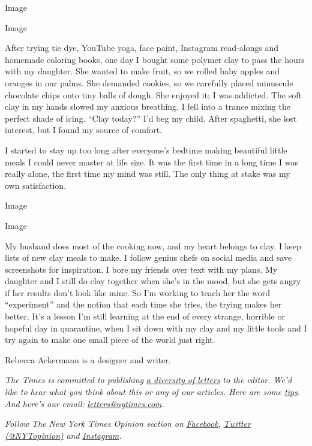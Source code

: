 Image

Image

After trying tie dye, YouTube yoga, face paint, Instagram read-alongs
and homemade coloring books, one day I bought some polymer clay to pass
the hours with my daughter. She wanted to make fruit, so we rolled baby
apples and oranges in our palms. She demanded cookies, so we carefully
placed minuscule chocolate chips onto tiny balls of dough. She enjoyed
it; I was addicted. The soft clay in my hands slowed my anxious
breathing. I fell into a trance mixing the perfect shade of icing.
``Clay today?'' I'd beg my child. After spaghetti, she lost interest,
but I found my source of comfort.

I started to stay up too long after everyone's bedtime making beautiful
little meals I could never master at life size. It was the first time in
a long time I was really alone, the first time my mind was still. The
only thing at stake was my own satisfaction.

Image

Image

My husband does most of the cooking now, and my heart belongs to clay. I
keep lists of new clay meals to make. I follow genius chefs on social
media and save screenshots for inspiration. I bore my friends over text
with my plans. My daughter and I still do clay together when she's in
the mood, but she gets angry if her results don't look like mine. So I'm
working to teach her the word ``experiment'' and the notion that each
time she tries, the trying makes her better. It's a lesson I'm still
learning at the end of every strange, horrible or hopeful day in
quarantine, when I sit down with my clay and my little tools and I try
again to make one small piece of the world just right.

Rebecca Ackermann is a designer and writer.

\emph{The Times is committed to publishing}
\href{https://www.nytimes.com/2019/01/31/opinion/letters/letters-to-editor-new-york-times-women.html}{\emph{a
diversity of letters}} \emph{to the editor. We'd like to hear what you
think about this or any of our articles. Here are some}
\href{https://help.nytimes.com/hc/en-us/articles/115014925288-How-to-submit-a-letter-to-the-editor}{\emph{tips}}\emph{.
And here's our email:}
\href{mailto:letters@nytimes.com}{\emph{letters@nytimes.com}}\emph{.}

\emph{Follow The New York Times Opinion section on}
\href{https://www.facebook.com/nytopinion}{\emph{Facebook}}\emph{,}
\href{http://twitter.com/NYTOpinion}{\emph{Twitter (@NYTopinion)}}
\emph{and}
\href{https://www.instagram.com/nytopinion/}{\emph{Instagram}}\emph{.}

